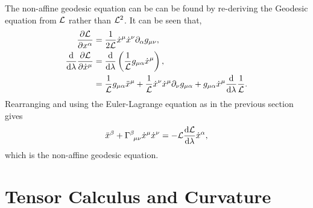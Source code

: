 The non-affine geodesic equation can be can be found by re-deriving the Geodesic equation from $\mathcal{L}$ rather than $\mathcal{L}^2$. It can be seen that,
\begin{align}
\frac{\partial{\mathcal{L}}}{\partial x^\alpha} &= \frac{1}{2\mathcal{L}} \dot{x}^\mu \dot{x}^\nu \partial_\alpha g_{\mu\nu},\\
\frac{\dd}{\dd \lambda}\frac{\partial \mathcal{L}}{\partial \dot{x}^\mu}&=\frac{\dd}{\dd \lambda} \left( \frac{1}{\mathcal{L}}g_{\mu\alpha}\dot{x}^\mu\right),\\
&= \frac{1}{\mathcal{L}}g_{\mu\alpha}\ddot{x}^\mu +  \frac{1}{\mathcal{L}}\dot{x}^\nu\dot{x}^\mu\partial_\nu g_{\mu\alpha} + g_{\mu\alpha}\dot{x}^\mu \frac{\dd}{\dd \lambda} \frac{1}{\mathcal{L}}.
\end{align}
Rearranging and using the Euler-Lagrange equation as in the previous section gives 
\begin{equation}
\ddot{x}^\beta + \Gamma^\beta_{\,\,\,\mu\nu}\dot{x}^\mu\dot{x}^\nu=-\mathcal{L} \frac{\dd \mathcal{L}}{\dd \lambda} \dot{x}^\alpha,
\end{equation}
which is the non-affine geodesic equation.









\newpage
\section{Tensor Calculus and Curvature}


